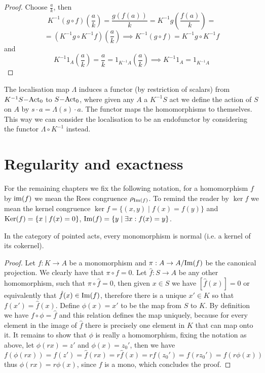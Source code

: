 \begin{proof}[Proof]
    Choose $\frac{a}{k}$, then
    \[
    K^{-1}(g\circ f)\left(\frac{a}{k}\right) = \frac{g(f(a))}{k} = K^{-1}g\left(\frac{f(a)}{k}\right) =\] \[=(K^{-1}g\circ K^{-1}f)(\frac{a}{k}) \implies K^{-1}(g\circ f) = K^{-1}g\circ K^{-1}f
    \]
    and 
    \[
        K^{-1}1_A\left(\frac{a}{k}\right) = \frac{a}{k} = 1_{K^{-1}A}(\frac{a}{k}) \implies K^{-1}1_A = 1_{K^{-1}A}
    \]
\end{proof}
\begin{remark}
    The localisation map $\Lambda$ induces a functor (by restriction of scalars) from $K^{-1}S\mathrm{-Act}_0$ to $S\mathrm{-Act}_0$, where given any 
    $A$ a $K^{-1}S$ act we define the action of $S$ on $A$ by $s\cdot a = \Lambda(s)\cdot a$. The functor maps the 
    homomorphisms to themselves. This way we can consider the 
    localisation to be an endofunctor by considering the functor $\Lambda\circ K^{-1}$ instead. 
\end{remark}
\section{Regularity and exactness}
    For the remaining chapters we fix the following notation, for a homomorphism $f$ by $\text{im}(f)$ we mean the 
    Rees congruence $\rho_{\mathrm{Im}(f)}$. To remind the reader by $\ker{f}$ we mean the kernel congruence $\ker{f} = \{(x,y) \mid f(x)=f(y)\}$
    and $\mathrm{Ker}(f) = \{x \mid f(x) = 0\}$, $\mathrm{Im}(f) = \{ y \mid \exists x : f(x) =y \}$.
\begin{proposition}
    In the category of pointed acts, every monomorphism is normal (i.e. a kernel of its cokernel). 
\end{proposition}
\begin{proof}[Proof]
    Let $f: K \to A$ be a monomorphism and $\pi : A \to A/\mathrm{Im}(f)$ be the canonical projection. We clearly have that 
    $\pi\circ f = 0$. Let $\hat{f} : S \to A$ be any other homomorphism, such that $\pi\circ\hat{f} = 0$, then 
    given $x\in S$ we have $[\hat{f}(x)]=0$ or equivalently that $\hat{f}(x)\in\mathrm{Im}(f)$, therefore there is a unique 
    $x'\in K$ so that $f(x')=\hat{f}(x)$. Define $\phi(x)=x'$ to be the map from $S$ to $K$. By definition we have 
    $f\circ\phi = \hat{f}$ and this relation defines the map uniquely, because for every element in the image of $\hat{f}$ there 
    is precisely one element in $K$ that can map onto it. It remains to show that $\phi$ is really a homomorphism, fixing the 
    notation as above, let $\phi(rx)=z'$ and $\phi(x)=z_0'$, then we have 
    \[
        f(\phi(rx))=f(z')=\hat{f}(rx)=r\hat{f}(x)=rf(z_0')=f(rz_0')=f(r\phi(x))
    \]
    thus $\phi(rx)=r\phi(x)$, since $f$ is a mono, which concludes the proof.
\end{proof}

